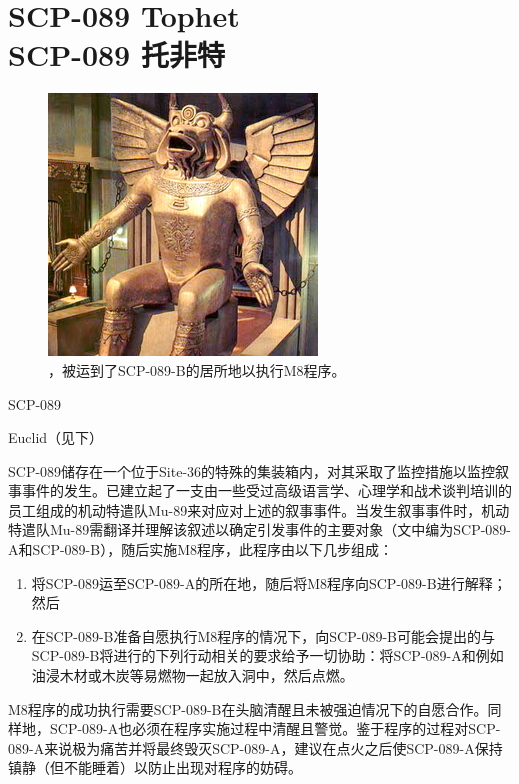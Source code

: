 \chapter[SCP-089 托非特]{
    SCP-089 Tophet\\
    SCP-089 托非特
}

\label{chap:SCP-089}

\begin{figure}[H]
    \centering
    \includegraphics[width=0.5\linewidth]{images/SCP.089.jpg}
    \caption*{，被运到了SCP-089-B的居所地以执行M8程序。}
\end{figure}

SCP-089

Euclid（见下）

SCP-089储存在一个位于Site-36的特殊的集装箱内，对其采取了监控措施以监控叙事事件的发生。已建立起了一支由一些受过高级语言学、心理学和战术谈判培训的员工组成的机动特遣队Mu-89来对应对上述的叙事事件。当发生叙事事件时，机动特遣队Mu-89需翻译并理解该叙述以确定引发事件的主要对象（文中编为SCP-089-A和SCP-089-B），随后实施M8程序，此程序由以下几步组成：

\begin{enumerate}
\item 将SCP-089运至SCP-089-A的所在地，随后将M8程序向SCP-089-B进行解释；然后
\item 在SCP-089-B准备自愿执行M8程序的情况下，向SCP-089-B可能会提出的与SCP-089-B将进行的下列行动相关的要求给予一切协助：将SCP-089-A和例如油浸木材或木炭等易燃物一起放入洞中，然后点燃。
\end{enumerate}

M8程序的成功执行需要SCP-089-B在头脑清醒且未被强迫情况下的自愿合作。同样地，SCP-089-A也必须在程序实施过程中清醒且警觉。鉴于程序的过程对SCP-089-A来说极为痛苦并将最终毁灭SCP-089-A，建议在点火之后使SCP-089-A保持镇静（但不能睡着）以防止出现对程序的妨碍。

